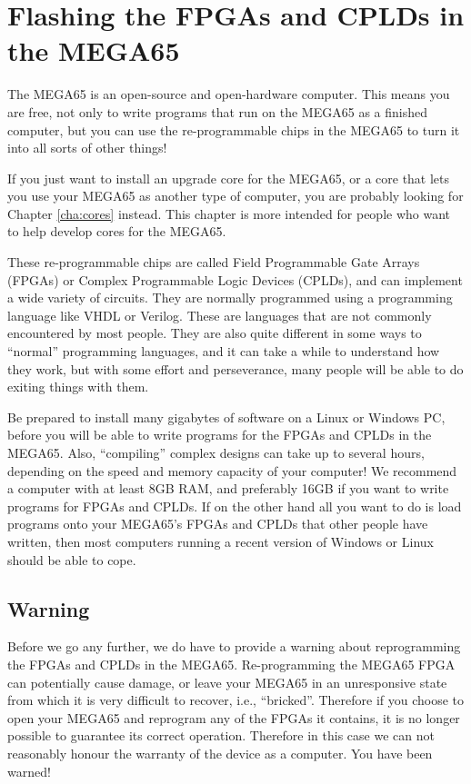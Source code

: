 \chapter{Flashing the FPGAs and CPLDs in the MEGA65}
\label{cha:fpgacpldflashing}

The MEGA65 is an open-source and open-hardware computer. This means you are free,
not only to write programs that run on the MEGA65 as a finished computer, but you can
use the re-programmable chips in the MEGA65 to turn it into all sorts of other things!

If you just want to install an upgrade core for the MEGA65, or a core that lets you use
your MEGA65 as another type of computer, you are probably looking for Chapter \ref{cha:cores} instead.
This chapter is more intended for people who want to help develop cores for the MEGA65.

These re-programmable chips are called Field Programmable Gate Arrays (FPGAs) or
Complex Programmable Logic Devices (CPLDs), and can implement a wide variety of circuits.
They are normally programmed using a programming language like VHDL or Verilog.  These
are languages that are not commonly encountered by most people.  They are also quite
different in some ways to ``normal'' programming languages, and it can take a while to
understand how they work, but with some effort and perseverance, many people will be
able to do exiting things with them.

Be prepared to install many gigabytes of software on a Linux or Windows PC, before you will
be able to write programs for the FPGAs and CPLDs in the MEGA65.  Also, ``compiling'' complex
designs can take up to several hours, depending on the speed and memory capacity of your computer!
We recommend a computer with at least 8GB RAM, and preferably 16GB if you want to write
programs for FPGAs and CPLDs. If on the other hand all you want to do is load programs onto
your MEGA65's FPGAs and CPLDs that other people have written, then most computers running a recent
version of Windows or Linux should be able to cope.

\section{Warning}

Before we go any further, we do have to provide a warning about reprogramming the FPGAs and
CPLDs in the MEGA65.
Re-programming the MEGA65 FPGA can potentially cause
damage, or leave your MEGA65 in an unresponsive state from which it is very difficult to
recover, i.e., ``bricked''.  Therefore if you choose to open your MEGA65 and reprogram
any of the FPGAs it contains, it is no longer possible to guarantee its correct operation.
Therefore in this case we can not reasonably honour the warranty of the device as a computer.
You have been warned!

